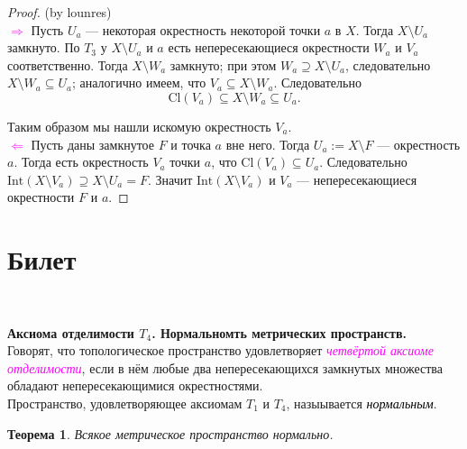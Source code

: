 \documentclass[a4paper,100pt]{article}
\theoremstyle{indented}
\newtheorem{theorem}{Теорема}
\begin{document}
\begin{proof}

    (by lounres)\\

    \textcolor{magenta}{$\Rightarrow$} Пусть $U_a$ --- некоторая окрестность некоторой точки $a$ в $X$. Тогда $X \setminus U_a$ замкнуто. По $T_3$ у $X \setminus U_a$ и $a$ есть непересекающиеся окрестности $W_a$ и $V_a$ соответственно. Тогда $X \setminus W_a$ замкнуто; при этом $W_a \supseteq X \setminus U_a$, следовательно $X \setminus W_a \subseteq U_a$; аналогично имеем, что $V_a \subseteq X \setminus W_a$. Следовательно
        \[
            \text{Cl}(V_a) \subseteq X \setminus W_a \subseteq U_a.
        \]
    
    Таким образом мы нашли искомую окрестность $V_a$.\\

    \textcolor{magenta}{$\Leftarrow$} Пусть даны замкнутое $F$ и точка $a$ вне него. Тогда $U_a := X \setminus F$ --- окрестность $a$. Тогда есть окрестность $V_a$ точки $a$, что $\text{Cl}(V_a) \subseteq U_a$. Следовательно $\text{Int}(X \setminus V_a) \supseteq X \setminus U_a = F$. Значит $\text{Int}(X \setminus V_a)$ и $V_a$ --- непересекающиеся окрестности $F$ и $a$.
\end{proof}


\section{Билет} \

\medskip

\textbf{Аксиома отделимости $T_4$. Нормальномть метрических пространств.}\\
        
    Говорят, что топологическое пространство удовлетворяет \textit{\textcolor{magenta}{четвёртой аксиоме отделимости}}, если в нём любые два непересекающихся замкнутых множества обладают непересекающимися окрестностями. \\
    
    Пространство, удовлетворяющее аксиомам $T_1$ и $T_4$, назыывается \textit{\textcolor{black}{нормальным}}.\\
    
    \begin{theorem}
        Всякое метрическое пространство нормально.
    \end{theorem}
    
\end{document}

